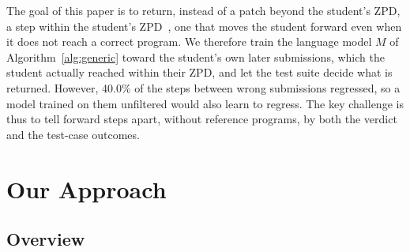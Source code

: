 \documentclass[conference]{IEEEtran}
\begin{document}
The goal of this paper is to return, instead of a patch beyond the student's ZPD, a step within the student's ZPD~\cite{cole1978mind}, one that moves the student forward even when it does not reach a correct program. We therefore train the language model \(M\) of Algorithm~\ref{alg:generic} toward the student's own later submissions, which the student actually reached within their ZPD, and let the test suite decide what is returned. However, 40.0\% of the steps between wrong submissions regressed, so a model trained on them unfiltered would also learn to regress. The key challenge is thus to tell forward steps apart, without reference programs, by both the verdict and the test-case outcomes.


\section{Our Approach}
\label{sec:approach}

\subsection{Overview}
\label{sec:construct}
\end{document}
